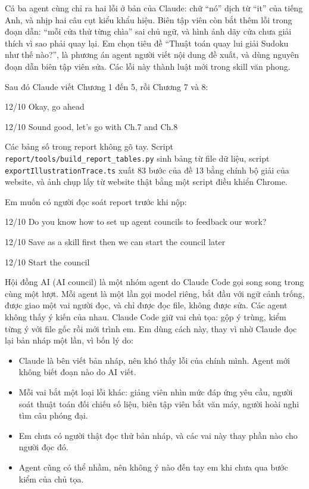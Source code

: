 Cả ba agent cùng chỉ ra hai lỗi ở bản của Claude: chữ ``nó'' dịch từ ``it'' của tiếng Anh, và nhịp hai câu cụt kiểu khẩu hiệu. Biên tập viên còn bắt thêm lỗi trong đoạn dẫn: ``mỗi cửa thử từng chìa'' sai chủ ngữ, và hình ảnh dãy cửa chưa giải thích vì sao phải quay lại. Em chọn tiêu đề ``Thuật toán quay lui giải Sudoku như thế nào?'', là phương án agent người viết nội dung đề xuất, và dùng nguyên đoạn dẫn biên tập viên sửa. Các lỗi này thành luật mới trong skill văn phong.

Sau đó Claude viết Chương 1 đến 5, rồi Chương 7 và 8:

\begin{promptbox}{12/10}
Okay, go ahead
\end{promptbox}

\begin{promptbox}{12/10}
Sound good, let's go with Ch.7 and Ch.8
\end{promptbox}

Các bảng số trong report không gõ tay. Script \texttt{report/tools/build\_report\_tables.py} sinh bảng từ file dữ liệu, script \texttt{exportIllustrationTrace.ts} xuất 83 bước của đề 13 bằng chính bộ giải của website, và ảnh chụp lấy từ website thật bằng một script điều khiển Chrome.

Em muốn có người đọc soát report trước khi nộp:

\begin{promptbox}{12/10}
Do you know how to set up agent councils to feedback our work?
\end{promptbox}

\begin{promptbox}{12/10}
Save as a skill first then we can start the council later
\end{promptbox}

\begin{promptbox}{12/10}
Start the council
\end{promptbox}

Hội đồng AI (AI council) là một nhóm agent do Claude Code gọi song song trong cùng một lượt. Mỗi agent là một lần gọi model riêng, bắt đầu với ngữ cảnh trống, được giao một vai người đọc, và chỉ được đọc file, không được sửa. Các agent không thấy ý kiến của nhau. Claude Code giữ vai chủ tọa: gộp ý trùng, kiểm từng ý với file gốc rồi mới trình em. Em dùng cách này, thay vì nhờ Claude đọc lại bản nháp một lần, vì bốn lý do:

\begin{itemize}
  \item Claude là bên viết bản nháp, nên khó thấy lỗi của chính mình. Agent mới không biết đoạn nào do AI viết.
  \item Mỗi vai bắt một loại lỗi khác: giảng viên nhìn mức đáp ứng yêu cầu, người soát thuật toán đối chiếu số liệu, biên tập viên bắt văn máy, người hoài nghi tìm câu phóng đại.
  \item Em chưa có người thật đọc thử bản nháp, và các vai này thay phần nào cho người đọc đó.
  \item Agent cũng có thể nhầm, nên không ý nào đến tay em khi chưa qua bước kiểm của chủ tọa.
\end{itemize}

